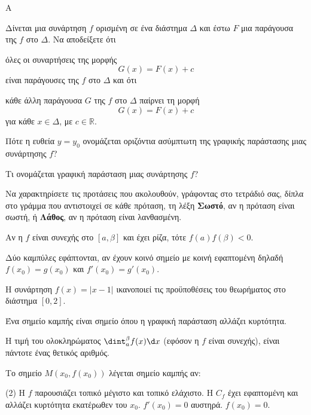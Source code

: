 \begin{thema}{A}
\begin{erwthma}
    \item Δίνεται μια συνάρτηση $ f $ ορισμένη σε ένα διάστημα $ \varDelta $ και έστω $ F $ μια παράγουσα της $ f $ στο $ \varDelta $. Να αποδείξετε ότι \begin{alist} \item όλες οι συναρτήσεις της μορφής \[ G(x)=F(x)+c \] είναι παράγουσες της $ f $ στο $ \varDelta $ και ότι \item κάθε άλλη παράγουσα $ G $ της $ f $ στο $ \varDelta $ παίρνει τη μορφή \[ G(x)=F(x)+c \] για κάθε $ x\in\varDelta $, με $ c\in\mathbb{R} $. \end{alist}
    \item Πότε η ευθεία $y=y_0$ ονομάζεται οριζόντια ασύμπτωτη της γραφικής παράστασης μιας συνάρτησης $f$?
    \item Τι ονομάζεται γραφική παράσταση μιας συνάρτησης $f$?
    \item Να χαρακτηρίσετε τις προτάσεις που ακολουθούν, γράφοντας στο τετράδιό σας, δίπλα στο γράμμα που αντιστοιχεί σε κάθε πρόταση, τη λέξη \textbf{Σωστό}, αν η πρόταση είναι σωστή, ή \textbf{Λάθος}, αν η πρόταση είναι λανθασμένη.
    \begin{alist}
        \item Αν η $f$ είναι συνεχής στο $[a, \beta]$ και έχει ρίζα, τότε $f(a)f(\beta) < 0$.
        \item Δύο καμπύλες εφάπτονται, αν έχουν κοινό σημείο με κοινή εφαπτομένη δηλαδή $f(x_0)=g(x_0)$ και $f'(x_0)=g'(x_0)$.
        \item Η συνάρτηση $f(x)=|x-1|$ ικανοποιεί τις προϋποθέσεις του θεωρήματος  στο διάστημα $[0,2]$.
        \item Ένα σημείο καμπής είναι σημείο όπου η γραφική παράσταση αλλάζει κυρτότητα.
        \item Η τιμή του ολοκληρώματος $\dint_{a}^{\beta} f(x) \d x$ (εφόσον η $f$ είναι συνεχής), είναι πάντοτε ένας θετικός αριθμός.
    \end{alist}
    \item Το σημείο $M(x_0, f(x_0))$ λέγεται σημείο καμπής αν:
    \begin{tasks}[label=\let\textdexiakeraia\relax\alph*.](2)
        \task H $f$ παρουσιάζει τοπικό μέγιστο και τοπικό ελάχιστο.
        \task H $C_f$ έχει εφαπτομένη και αλλάζει κυρτότητα εκατέρωθεν του $x_0$.
        \task $f'(x_0) = 0$ αυστηρά.
        \task $f(x_0) = 0$.
    \end{tasks}
\end{erwthma}
\end{thema}


